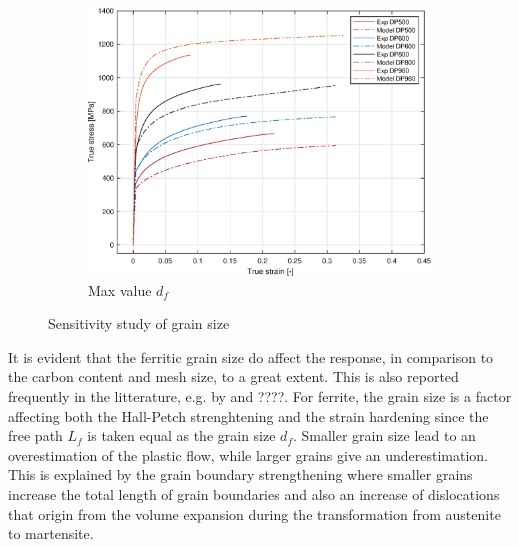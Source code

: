 \documentclass{article}
\begin{document}
\begin{figure}[h!]
\begin{subfigure}[b]{0.3\textwidth}
         \centering
         \includegraphics[width=\textwidth]{GrainMax2.eps}
         \caption{Max value $d_f$}
         \label{fig:GrainMax}
     \end{subfigure}
     \caption{Sensitivity study of grain size}
     \label{fig:GrainSize}
\end{figure}

It is evident that the ferritic grain size do affect the response, in comparison to the carbon content and mesh size, to a great extent. This is also reported frequently in the litterature, e.g. by \cite{Mazaheri} and ????. For ferrite, the grain size is a factor affecting both the Hall-Petch strenghtening and the strain hardening since the free path $L_f$ is taken equal as the grain size $d_f$. Smaller grain size lead to an overestimation of the plastic flow, while larger grains give an underestimation. This is explained by the grain boundary strengthening where smaller grains increase the total length of grain boundaries and also an increase of dislocations that origin from the volume expansion during the transformation from austenite to martensite. 
\end{document}

